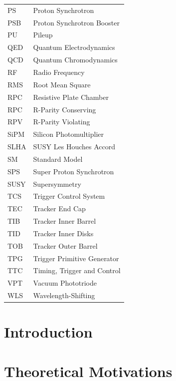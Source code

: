 \documentclass[12pt]{thesis}  %
\renewcommand{\baselinestretch}{2}
\begin{document}
\begin{longtable}[l]{@{}l@{\ \ \ \ \ \ \ \ \ \ \ \ }l}
PS         & Proton Synchrotron \\
PSB        & Proton Synchrotron Booster \\
PU         & Pileup \\
QED        & Quantum Electrodynamics \\
QCD        & Quantum Chromodynamics \\
RF         & Radio Frequency \\
RMS        & Root Mean Square \\
RPC        & Resistive Plate Chamber \\
RPC        & R-Parity Conserving \\
RPV        & R-Parity Violating \\
SiPM       & Silicon Photomultiplier \\
SLHA       & SUSY Les Houches Accord \\
SM         & Standard Model \\
SPS        & Super Proton Synchrotron \\
SUSY       & Supersymmetry \\
TCS        & Trigger Control System \\
TEC        & Tracker End Cap \\
TIB        & Tracker Inner Barrel \\
TID        & Tracker Inner Disks \\
TOB        & Tracker Outer Barrel \\
TPG        & Trigger Primitive Generator \\
TTC        & Timing, Trigger and Control \\
VPT        & Vacuum Phototriode \\
WLS        & Wavelength-Shifting \\
\end{longtable}

\newpage
\setlength{\parskip}{0em}
\renewcommand{\baselinestretch}{2}
\normalsize

\setcounter{page}{1}
\chapter{Introduction
\label{ch:introduction}}
\chapter{Theoretical Motivations
\label{ch:theory}}
\end{document}
